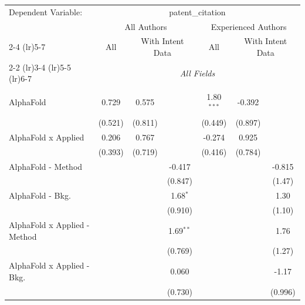 \begingroup
\centering
\begin{tabular}{lcccccc}
   \tabularnewline \midrule \midrule
   Dependent Variable: & \multicolumn{6}{c}{patent\_citation}\\
 & \multicolumn{3}{c}{All Authors} & \multicolumn{3}{c}{Experienced Authors} \\
\cmidrule(lr){2-4} \cmidrule(lr){5-7}
 & \multicolumn{1}{c}{All} & \multicolumn{2}{c}{With Intent Data} & \multicolumn{1}{c}{All} & \multicolumn{2}{c}{With Intent Data} \\
\cmidrule(lr){2-2} \cmidrule(lr){3-4} \cmidrule(lr){5-5} \cmidrule(lr){6-7}
 & \multicolumn{6}{c}{\textit{All Fields}} \\ \\
   AlphaFold                      & 0.729      & 0.575         &               & 1.80$^{***}$  & -0.392  &   \\   
                                  & (0.521)    & (0.811)       &               & (0.449)       & (0.897) &   \\   
   AlphaFold x Applied            & 0.206      & 0.767         &               & -0.274        & 0.925   &   \\   
                                  & (0.393)    & (0.719)       &               & (0.416)       & (0.784) &   \\   
   AlphaFold - Method             &            &               & -0.417        &               &         & -0.815\\   
                                  &            &               & (0.847)       &               &         & (1.47)\\   
   AlphaFold - Bkg.               &            &               & 1.68$^{*}$    &               &         & 1.30\\   
                                  &            &               & (0.910)       &               &         & (1.10)\\   
   AlphaFold x Applied - Method   &            &               & 1.69$^{**}$   &               &         & 1.76\\   
                                  &            &               & (0.769)       &               &         & (1.27)\\   
   AlphaFold x Applied - Bkg.     &            &               & 0.060         &               &         & -1.17\\   
                                  &            &               & (0.730)       &               &         & (0.996)\\   

\end{tabular}
